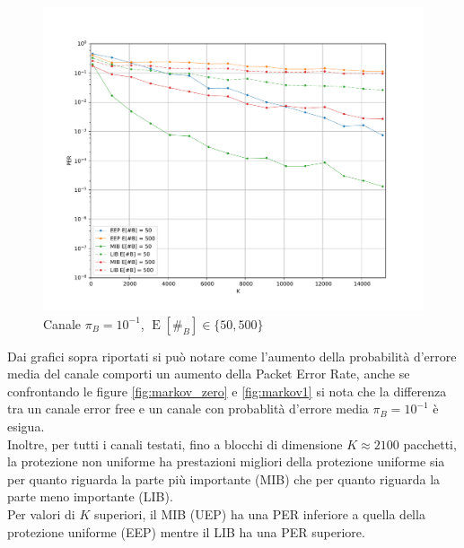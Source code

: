 \documentclass[italian, a4paper, 12pt]{article}
\newcommand{\E}[1]{\operatorname{E}\left[#1\right]}
\newcommand{\EnB}{\E{\#_B}}
\begin{document}
\begin{figure}[H]
  \centering
  \includegraphics[width=\textwidth]{plot_markov_pi10big}
  \caption{Canale $\pi_B = 10^{-1}$, $\EnB \in \{50, 500\}$}
  \label{fig:markov1bis}
\end{figure}
Dai grafici sopra riportati si può notare come l'aumento della probabilità d'errore
media del canale comporti un aumento della Packet Error Rate, anche se confrontando le
figure \ref{fig:markov_zero} e \ref{fig:markov1} si nota che la differenza tra un canale
error free e un canale con probablità d'errore media $\pi_B = 10^{-1}$ è esigua.\\
Inoltre, per tutti i canali testati, fino a blocchi di dimensione $K \approx 2100$ pacchetti, 
la protezione non uniforme ha
prestazioni migliori della protezione uniforme sia per quanto riguarda la
parte più importante (MIB) che per quanto riguarda la parte meno importante (LIB).\\
Per valori di $K$ superiori, il MIB (UEP) ha una PER inferiore a quella della protezione uniforme (EEP)
mentre il LIB ha una PER superiore.\\

%
%
\end{document}
